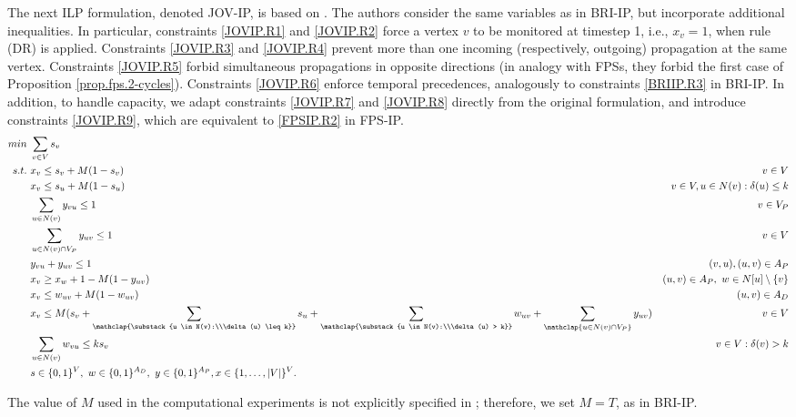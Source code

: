 \documentclass{article}
\newcommand{\FPSIP}{FPS-IP\xspace}
\newcommand{\BRIIP}{BRI-IP\xspace}
\newcommand{\JOVIP}{JOV-IP\xspace}
\begin{document}
The next ILP formulation, denoted \JOVIP, is based on \citet{Jovanovic2020}.
The authors consider the same variables as in \BRIIP, but incorporate additional inequalities.
In particular, constraints \eqref{JOVIP.R1} and \eqref{JOVIP.R2} force a vertex $v$ to be monitored at timestep 1, i.e., $x_v = 1$, when rule (DR) is applied.
Constraints \eqref{JOVIP.R3} and \eqref{JOVIP.R4} prevent more than one incoming (respectively, outgoing) propagation at the same vertex.
Constraints \eqref{JOVIP.R5} forbid simultaneous propagations in opposite directions (in analogy with FPSs, they forbid the first case of Proposition \ref{prop.fps.2-cycles}).
Constraints \eqref{JOVIP.R6} enforce temporal precedences, analogously to constraints \eqref{BRIIP.R3} in \BRIIP.
In addition, to handle capacity, we adapt constraints \eqref{JOVIP.R7} and \eqref{JOVIP.R8} directly from the original formulation, and introduce constraints \eqref{JOVIP.R9}, which are equivalent to \eqref{FPSIP.R2} in \FPSIP.
{
\small
\begin{align}
min\ & \sum_{v \in V} s_v \label{JOVIP.ObjFun}\\
s.t.\ & x_v \leq s_v + M(1-s_v) & v \in V \label{JOVIP.R1}\\
& x_v \leq s_u + M(1-s_u) & v \in V, u \in N(v) : \delta(u) \leq k \label{JOVIP.R2}\\
& \sum_{u \in N(v)} y_{vu} \leq 1 & v \in V_P \label{JOVIP.R3}\\
& \sum_{u \in N(v) \cap V_P} y_{uv} \leq 1 & v \in V \label{JOVIP.R4}\\
& y_{vu} + y_{uv} \leq 1 & (v,u),(u,v) \in A_P \label{JOVIP.R5}\\
& x_v \geq x_w + 1 - M(1-y_{uv}) & (u,v) \in A_P,\ w \in N[u] \setminus \{v\} \label{JOVIP.R6}\\
& x_v \leq w_{uv} + M(1-w_{uv}) & (u,v) \in A_D \label{JOVIP.R7}\\
& x_v \leq M(s_v + \sum_{\mathclap{\substack{u \in N(v):\\\delta(u) \leq k}}} s_u + \sum_{\mathclap{\substack{u \in N(v):\\\delta(u) > k}}} w_{uv} + \sum_{\mathclap{u \in N(v) \cap V_P}} y_{uv}) & v \in V \label{JOVIP.R8}\\
& \sum_{u \in N(v)} w_{vu} \leq ks_v & v \in V: \delta(v) > k \label{JOVIP.R9}\\
& s \in \{0,1\}^V,\ w \in \{0,1\}^{A_D},\ y \in \{0,1\}^{A_P}, x \in \{1,\ldots,|V|\}^V. \span \notag
\end{align}
}

The value of $M$ used in the computational experiments is not explicitly specified in \citet{Jovanovic2020}; therefore, we set $M = T$, as in \BRIIP.
\end{document}
